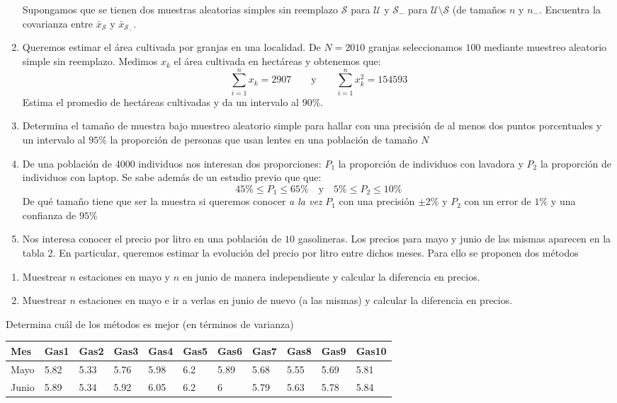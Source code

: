 \documentclass[
]{book}
\providecommand{\tightlist}{%
  \setlength{\itemsep}{0pt}\setlength{\parskip}{0pt}}
\begin{document}
\begin{enumerate}
  Supongamos que se tienen dos muestras aleatorias simples sin reemplazo \(\mathcal{S}\) para \(\mathcal{U}\) y \(\mathcal{S}_{-}\) para \(\mathcal{U}\setminus\mathcal{S}\) (de tamaños \(n\) y \(n_{-}\). Encuentra la covarianza entre \(\bar{x}_{\mathcal{S}}\) y \(\bar{x}_{\mathcal{S}_{-}}\).
\item
  Queremos estimar el área cultivada por granjas en una localidad. De \(N = 2010\) granjas seleccionamos \(100\) mediante muestreo aleatorio simple sin reemplazo. Medimos \(x_k\) el área cultivada en hectáreas y obtenemos que:
  \[
  \sum_{i = 1}^n x_k = 2907 \qquad \text{y} \qquad \sum_{i = 1}^n x_k^2= 154593
  \]
  Estima el promedio de hectáreas cultivadas y da un intervalo al \(90\%\).
\item
  Determina el tamaño de muestra bajo muestreo aleatorio simple para hallar con una precisión de al menos dos puntos porcentuales y un intervalo al \(95\%\) la proporción de personas que usan lentes en una población de tamaño \(N\)
\item
  De una población de 4000 individuos nos interesan dos proporciones: \(P_1\) la proporción de individuos con lavadora y \(P_2\) la proporción de individuos con laptop. Se sabe además de un estudio previo que que:
  \[
  45\% \leq P_1 \leq 65\% \quad \text{y} \quad 5\% \leq P_2 \leq 10\%
  \]
  De qué tamaño tiene que ser la muestra si queremos conocer \emph{a la vez} \(P_1\) con una precisión \(\pm 2\%\) y \(P_2\) con un error de \(1\%\) y una confianza de \(95\%\)
\item
  Nos interesa conocer el precio por litro en una población de \(10\) gasolineras. Los precios para mayo y junio de las mismas aparecen en la tabla 2. En particular, queremos estimar la evolución del precio por litro entre dichos meses. Para ello se proponen dos métodos
\end{enumerate}

\begin{enumerate}
\def\labelenumi{\alph{enumi}.}
\tightlist
\item
  Muestrear \(n\) estaciones en mayo y \(n\) en junio de manera independiente y calcular la diferencia en precios.
\item
  Muestrear \(n\) estaciones en mayo e ir a verlas en junio de nuevo (a las mismas) y calcular la diferencia en precios.
\end{enumerate}

Determina cuál de los métodos es mejor (en términos de varianza)

\begin{table}
\centering
\begin{tabular}{l|l|l|l|l|l|l|l|l|l|l}
\hline
Mes & Gas1 & Gas2 & Gas3 & Gas4 & Gas5 & Gas6 & Gas7 & Gas8 & Gas9 & Gas10\\
\hline
Mayo & 5.82 & 5.33 & 5.76 & 5.98 & 6.2 & 5.89 & 5.68 & 5.55 & 5.69 & 5.81\\
\hline
Junio & 5.89 & 5.34 & 5.92 & 6.05 & 6.2 & 6 & 5.79 & 5.63 & 5.78 & 5.84\\
\hline
\end{tabular}
\end{table}
\end{document}

